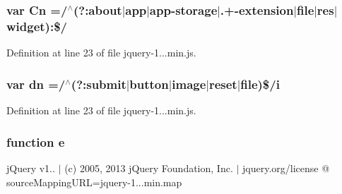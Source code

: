 \subsubsection[{Cn}]{\setlength{\rightskip}{0pt plus 5cm}var Cn =/$^\wedge$(?\+:about$\vert$app$\vert$app-\/storage$\vert$.+-\/extension$\vert$file$\vert$res$\vert$widget)\+:\$/}\label{obj_2_release_2_package_2_package_tmp_2_scripts_2jquery-1_810_82_8min_8js_ab832fcb3f80f807f0b65d1e3b4904de8}


Definition at line 23 of file jquery-\/1...\+min.\+js.

\hypertarget{obj_2_release_2_package_2_package_tmp_2_scripts_2jquery-1_810_82_8min_8js_ab5e3f3e2b2507b73e2d8092caa5c8650}{}
\subsubsection[{dn}]{\setlength{\rightskip}{0pt plus 5cm}var dn =/$^\wedge$(?\+:submit$\vert${\bf button}$\vert$image$\vert$reset$\vert$file)\$/{\bf i}}\label{obj_2_release_2_package_2_package_tmp_2_scripts_2jquery-1_810_82_8min_8js_ab5e3f3e2b2507b73e2d8092caa5c8650}


Definition at line 23 of file jquery-\/1...\+min.\+js.

\hypertarget{obj_2_release_2_package_2_package_tmp_2_scripts_2jquery-1_810_82_8min_8js_a2c038346d47955cbe2cb91e338edd7e1}{}
\subsubsection[{e}]{\setlength{\rightskip}{0pt plus 5cm}function e}\label{obj_2_release_2_package_2_package_tmp_2_scripts_2jquery-1_810_82_8min_8js_a2c038346d47955cbe2cb91e338edd7e1}
j\+Query v1.. $\vert$ (c) 2005, 2013 j\+Query Foundation, Inc. $\vert$ jquery.\+org/license @ source\+Mapping\+U\+R\+L=jquery-\/1...\+min.\+map 

